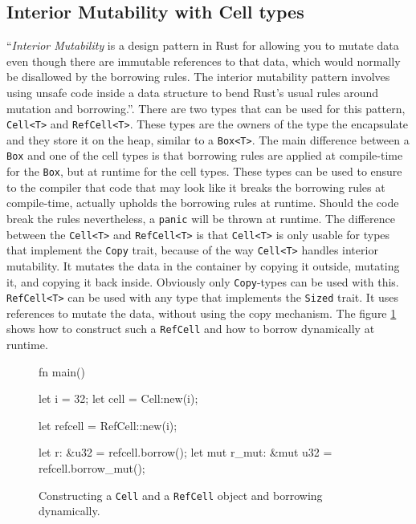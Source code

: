\documentclass[twocolumn]{article}
\begin{document}
\subsection{Interior Mutability with Cell types}
``\textit{Interior Mutability} is a design pattern in Rust for allowing you to mutate data even though there are immutable references to that data, which would normally be disallowed by the borrowing rules. The interior mutability pattern involves using unsafe code inside a data structure to bend Rust's usual rules around mutation and borrowing.''\cite{RustBook-InteriorMutability}.
There are two types that can be used for this pattern, \texttt{Cell<T>} and \texttt{RefCell<T>}.
These types are the owners of the type the encapsulate and they store it on the heap, similar to a \texttt{Box<T>}.
The main difference between a \texttt{Box} and one of the cell types is that borrowing rules are applied at compile-time for the \texttt{Box}, but at runtime for the cell types.
These types can be used to ensure to the compiler that code that may look like it breaks the borrowing rules at compile-time, actually upholds the borrowing rules at runtime.
Should the code break the rules nevertheless, a \texttt{panic} will be thrown at runtime.
The difference between the \texttt{Cell<T>} and \texttt{RefCell<T>} is that \texttt{Cell<T>} is only usable for types that implement the \texttt{Copy} trait, because of the way \texttt{Cell<T>} handles interior mutability.
It mutates the data in the container by copying it outside, mutating it, and copying it back inside.
Obviously only \texttt{Copy}-types can be used with this.
\texttt{RefCell<T>} can be used with any type that implements the \texttt{Sized} trait.
It uses references to mutate the data, without using the copy mechanism.
The figure \ref{mutability-refcell} shows how to construct such a \texttt{RefCell} and how to borrow dynamically at runtime.
\begin{figure}
\begin{rustcode}
fn main() {
    let i = 32;
    let cell = Cell:new(i);
    
    let refcell = RefCell::new(i);

    let r: &u32 = refcell.borrow();
    let mut r_mut: &mut u32 
        = refcell.borrow_mut();
}
\end{rustcode}
\vspace{-2em}
\caption{Constructing a \texttt{Cell} and a \texttt{RefCell} object and borrowing dynamically.}
\label{mutability-refcell}
\end{figure}
\end{document}
